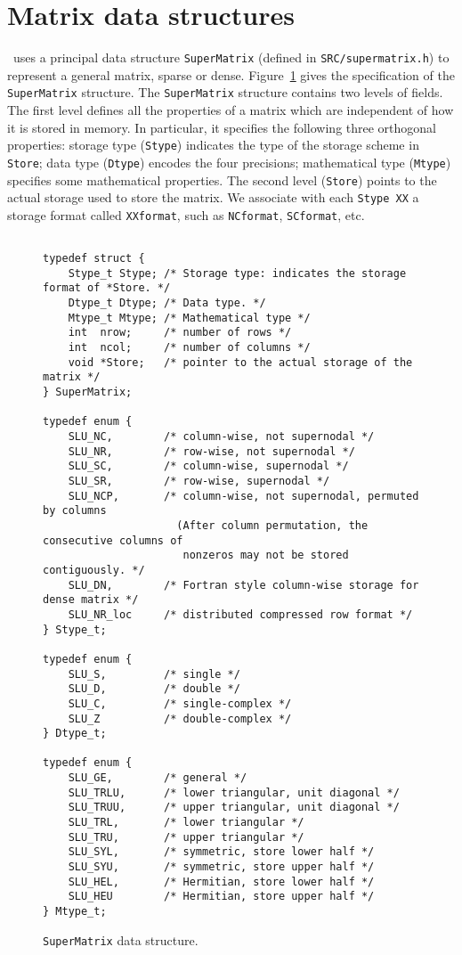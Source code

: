 \section{Matrix data structures}
\label{sec:rep}

    \superlu\ uses a principal data structure {\tt SuperMatrix} (defined in
{\tt SRC/supermatrix.h}) to represent a general matrix, sparse or dense. 
 Figure~\ref{fig:struct} gives the specification of the {\tt SuperMatrix} 
structure. The {\tt SuperMatrix} structure contains two levels of fields.
The first level defines all the properties of a matrix which are independent
of how it is stored in memory. In particular, it specifies the following 
three orthogonal properties: storage type ({\tt Stype}) indicates the 
type of the storage scheme in {\tt *Store}; data type ({\tt Dtype}) 
encodes the four precisions; 
mathematical type ({\tt Mtype}) specifies some mathematical properties. 
The second level ({\tt *Store}) points to the actual storage
used to store the matrix. We associate with each {\tt Stype XX}
a storage format called {\tt XXformat}, such as {\tt NCformat},
{\tt SCformat}, etc.

\begin{figure}
\begin{verbatim}

typedef struct {
    Stype_t Stype; /* Storage type: indicates the storage format of *Store. */
    Dtype_t Dtype; /* Data type. */
    Mtype_t Mtype; /* Mathematical type */
    int  nrow;     /* number of rows */
    int  ncol;     /* number of columns */
    void *Store;   /* pointer to the actual storage of the matrix */
} SuperMatrix;

typedef enum {
    SLU_NC,        /* column-wise, not supernodal */
    SLU_NR,        /* row-wise, not supernodal */
    SLU_SC,        /* column-wise, supernodal */
    SLU_SR,        /* row-wise, supernodal */
    SLU_NCP,       /* column-wise, not supernodal, permuted by columns
                     (After column permutation, the consecutive columns of 
                      nonzeros may not be stored contiguously. */
    SLU_DN,        /* Fortran style column-wise storage for dense matrix */
    SLU_NR_loc     /* distributed compressed row format */ 
} Stype_t;

typedef enum {
    SLU_S,         /* single */
    SLU_D,         /* double */
    SLU_C,         /* single-complex */
    SLU_Z          /* double-complex */
} Dtype_t;

typedef enum {
    SLU_GE,        /* general */
    SLU_TRLU,      /* lower triangular, unit diagonal */
    SLU_TRUU,      /* upper triangular, unit diagonal */
    SLU_TRL,       /* lower triangular */
    SLU_TRU,       /* upper triangular */
    SLU_SYL,       /* symmetric, store lower half */
    SLU_SYU,       /* symmetric, store upper half */
    SLU_HEL,       /* Hermitian, store lower half */
    SLU_HEU        /* Hermitian, store upper half */
} Mtype_t;

\end{verbatim}
\caption{{\tt SuperMatrix} data structure.}
\label{fig:struct}
\end{figure}

